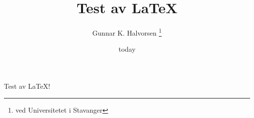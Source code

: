\documentclass[12pt, letterpaper]{article}
\title{Test av \LaTeX{}}
\author{Gunnar K. Halvorsen \thanks{ved Universitetet i Stavanger}}
\date{today}
\begin{document}
\maketitle

Test av \LaTeX{}! 

\end{document}
